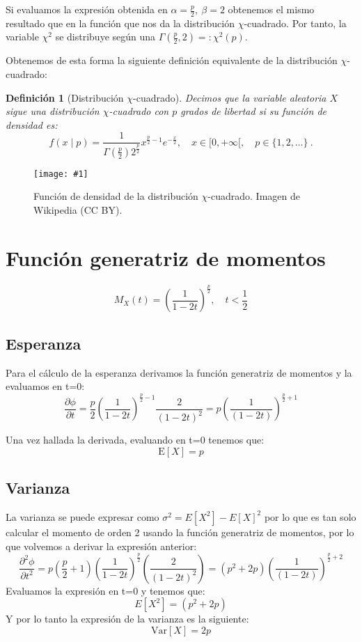 \documentclass[a4paper, 10pt]{article} %
\newcommand{\figura}[2]{\begin{figure}[hbtp]\centering \texttt{[image: \#1]} \caption{#2} \end{figure}}
\newtheorem{definition}{Definición}[section]
\begin{document}
Si evaluamos la expresión obtenida en $\alpha=\frac p 2,~\beta=2$ obtenemos el mismo resultado que en la función que nos da la distribución $\chi$-cuadrado. Por tanto, la variable $\chi^2$ se distribuye según una $\Gamma(\frac p 2, 2)=:\chi^2(p)$.

Obtenemos de esta forma la siguiente definición equivalente de la distribución $\chi$-cuadrado:
\begin{definition}[Distribución $\chi$-cuadrado]
  Decimos que la variable aleatoria $X$ sigue una distribución $\chi$-cuadrado con $p$ grados de libertad si su función de densidad es:
  $$f(x\mid p) = \frac 1 {\Gamma(\frac p 2)2^{\frac p 2}}x^{\frac p 2-1}e^{-\frac x 2},\quad x\in[0,+\infty[,\quad p\in\{1,2,\dots\}~.$$
\end{definition}

\figura{pdf.png}{Función de densidad de la distribución $\chi$-cuadrado. Imagen de Wikipedia (CC BY).}

\section{Función generatriz de momentos}
$$M_X(t)=\left(\frac 1 {1 - 2t}\right)^{\frac p 2},\quad t<\frac 1 2$$

\subsection{Esperanza}
Para el cálculo de la esperanza derivamos la función generatriz de momentos y la evaluamos en t=0:
$$\frac{\partial\phi}{\partial t} = \frac{p}{2} (\frac{1}{1-2t})^{\frac{p}{2}-1} \frac{2}{(1-2t)^{2}} = p (\frac{1}{(1-2t)})^{\frac{p}{2}+1} $$

Una vez hallada la derivada, evaluando en t=0 tenemos que:
$$\mathrm E[X]=p$$


\subsection{Varianza}
La varianza se puede expresar como $\sigma^2=E[X^2]-E[X]^2$ por lo que es tan solo calcular el momento de orden 2 usando la función generatriz de momentos, por lo que volvemos a derivar la expresión anterior:
$$\frac{\partial^2\phi}{\partial t^2} = p (\frac{p}{2}+1) (\frac{1}{1-2t})^{\frac{p}{2}} (\frac{2}{(1-2t)^{2}}) = (p^2+2p) (\frac{1}{(1-2t)})^{\frac{p}{2}+2}  $$
Evaluamos la expresión en t=0 y tenemos que:
$$E[X^2] = (p^2+2p)$$
Y por lo tanto la expresión de la varianza es la siguiente:
$$\mathrm{Var}[X]=2p$$
\end{document}
